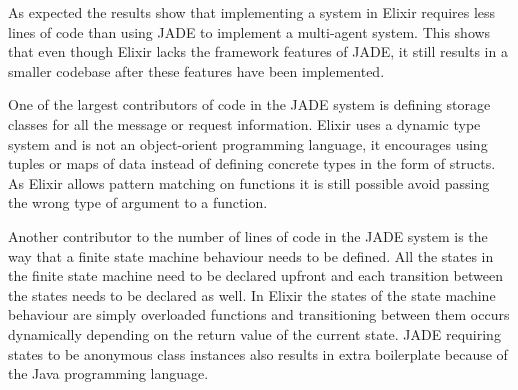 As expected the results show that implementing a system in Elixir requires less lines of code than using JADE to implement a multi-agent system.
This shows that even though Elixir lacks the framework features of JADE, it still results in a smaller codebase after these features have been implemented.

One of the largest contributors of code in the JADE system is defining storage classes for all the message or request information.
Elixir uses a dynamic type system and is not an object-orient programming language, it encourages using tuples or maps of data instead of defining concrete types in the form of structs.
As Elixir allows pattern matching on functions it is still possible avoid passing the wrong type of argument to a function.

Another contributor to the number of lines of code in the JADE system is the way that a finite state machine behaviour needs to be defined.
All the states in the finite state machine need to be declared upfront and each transition between the states needs to be declared as well.
In Elixir the states of the state machine behaviour are simply overloaded functions and transitioning between them occurs dynamically depending on the return value of the current state.
JADE requiring states to be anonymous class instances also results in extra boilerplate because of the Java programming language.
